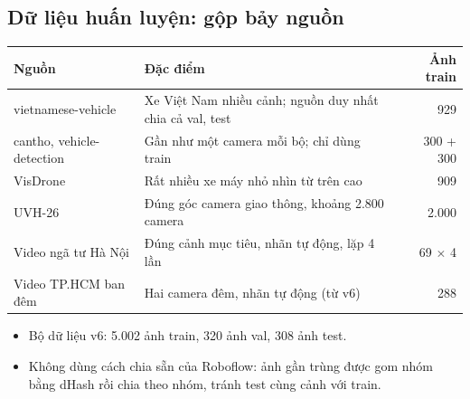 \documentclass[aspectratio=\mlwAspectRatio, \mlwBaseSize, t]{beamer}
\begin{document}
\subsection{Dữ liệu huấn luyện: gộp bảy nguồn}
\begin{frame}{\stitle}
  \centering
  \small
  \begin{tabularx}{\linewidth}{@{}P{4.1cm}Yr@{}}
    \toprule
    \textbf{Nguồn} & \textbf{Đặc điểm} & \textbf{Ảnh train} \\
    \midrule
    vietnamese-vehicle & Xe Việt Nam nhiều cảnh; nguồn duy nhất chia cả val, test & 929 \\
    cantho, vehicle-detection & Gần như một camera mỗi bộ; chỉ dùng train & 300 + 300 \\
    VisDrone & Rất nhiều xe máy nhỏ nhìn từ trên cao & 909 \\
    UVH-26 & Đúng góc camera giao thông, khoảng 2.800 camera & 2.000 \\
    Video ngã tư Hà Nội & Đúng cảnh mục tiêu, nhãn tự động, lặp 4 lần & 69 $\times$ 4 \\
    Video TP.HCM ban đêm & Hai camera đêm, nhãn tự động (từ v6) & 288 \\
    \bottomrule
  \end{tabularx}\par
  \vspace{0.6em}
  \begin{itemize}
    \item Bộ dữ liệu v6: \alert{5.002 ảnh train}, 320 ảnh val, 308 ảnh test.
    \item Không dùng cách chia sẵn của Roboflow: ảnh gần trùng được gom nhóm bằng dHash rồi chia theo nhóm, tránh test
          cùng cảnh với train.
  \end{itemize}
\end{frame}
\end{document}
